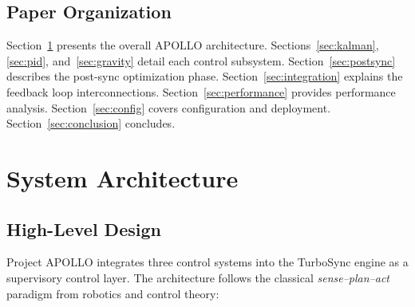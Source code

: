 \documentclass[11pt,a4paper]{article}
\begin{document}
\subsection{Paper Organization}

Section~\ref{sec:architecture} presents the overall APOLLO architecture. Sections~\ref{sec:kalman}, \ref{sec:pid}, and~\ref{sec:gravity} detail each control subsystem. Section~\ref{sec:postsync} describes the post-sync optimization phase. Section~\ref{sec:integration} explains the feedback loop interconnections. Section~\ref{sec:performance} provides performance analysis. Section~\ref{sec:config} covers configuration and deployment. Section~\ref{sec:conclusion} concludes.

\section{System Architecture}
\label{sec:architecture}

\subsection{High-Level Design}

Project APOLLO integrates three control systems into the TurboSync engine as a supervisory control layer. The architecture follows the classical \emph{sense--plan--act} paradigm from robotics and control theory:
\end{document}
